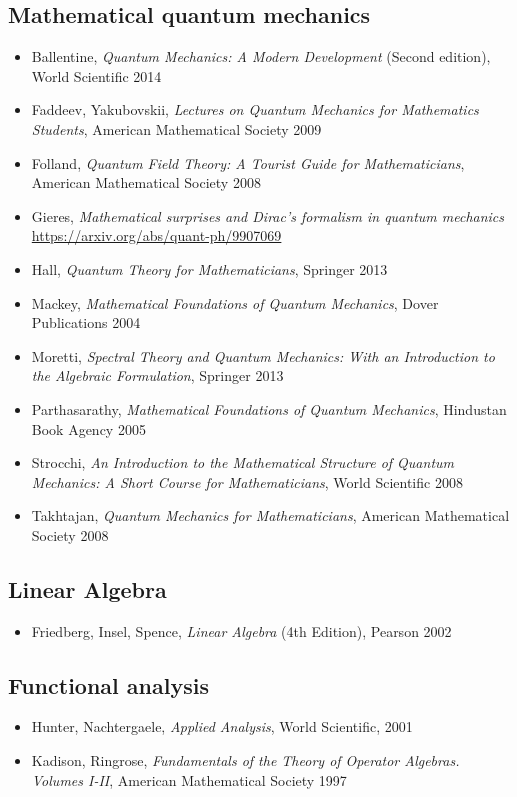 
\subsection*{Mathematical quantum mechanics}

\begin{itemize}
\item Ballentine, \textit{Quantum Mechanics: A Modern Development} (Second edition), World Scientific 2014
\item Faddeev, Yakubovskii, \textit{Lectures on Quantum Mechanics for Mathematics Students}, American Mathematical Society 2009
\item Folland, \textit{Quantum Field Theory: A Tourist Guide for Mathematicians},  American Mathematical Society 2008
\item Gieres, \textit{Mathematical surprises and Dirac's formalism in quantum mechanics}\\
\url{https://arxiv.org/abs/quant-ph/9907069}
\item Hall, \textit{Quantum Theory for Mathematicians}, Springer 2013
\item Mackey, \textit{Mathematical Foundations of Quantum Mechanics}, Dover Publications 2004
\item Moretti, \textit{Spectral Theory and Quantum Mechanics: With an Introduction to the Algebraic Formulation}, Springer 2013
\item Parthasarathy, \textit{Mathematical Foundations of Quantum Mechanics}, Hindustan Book Agency 2005
\item Strocchi, \textit{An Introduction to the Mathematical Structure of Quantum Mechanics: A Short Course for Mathematicians}, World Scientific 2008
\item Takhtajan, \textit{Quantum Mechanics for Mathematicians}, American Mathematical Society 2008
\end{itemize}

\subsection*{Linear Algebra}

\begin{itemize}
\item Friedberg, Insel, Spence, \textit{Linear Algebra} (4th Edition), Pearson 2002
\end{itemize}


\subsection*{Functional analysis}

\begin{itemize}
\item Hunter, Nachtergaele, \textit{Applied Analysis}, World Scientific, 2001
\item Kadison, Ringrose, \textit{Fundamentals of the Theory of Operator Algebras. Volumes I-II}, American Mathematical Society 1997
\end{itemize}





